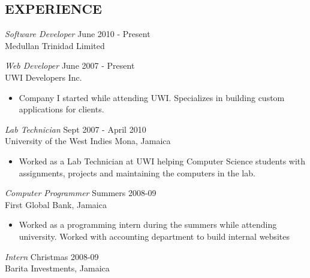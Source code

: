 \documentclass[margin]{res}
\begin{document}
\begin{resume}
\section{EXPERIENCE} 

				{\sl Software Developer } \hfill June 2010 - Present \\
                Medullan Trinidad Limited
                
                {\sl Web Developer } \hfill            June 2007 - Present \\
                UWI Developers Inc.
                 \begin{itemize}  \itemsep -2pt %
                 \item Company I started while attending UWI. Specializes in building custom applications for clients.
                 \end{itemize} 
                 
                {\sl Lab Technician } \hfill        Sept 2007 - April 2010 \\
                University of the West Indies Mona, Jamaica
                  \begin{itemize}
                   \item Worked as a Lab Technician at UWI helping Computer Science students with assignments, projects and maintaining the computers in the lab.
                   \end{itemize} 
                   
                {\sl Computer Programmer } \hfill        Summers 2008-09 \\
                First Global Bank, Jamaica
                  \begin{itemize}
                   \item Worked as a programming intern during the summers while attending university. Worked with accounting department to build internal websites
                   \end{itemize} 
 
                 {\sl Intern } \hfill        Christmas 2008-09 \\
                Barita Investments, Jamaica\\\\


\end{resume}
\end{document}
